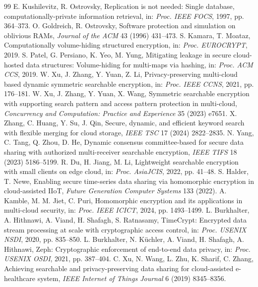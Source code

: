 \documentclass[11pt,a4paper]{article}
\begin{document}
\begin{thebibliography}{99}
 E. Kushilevitz, R. Ostrovsky, Replication is not needed: Single database, computationally-private information retrieval, in: \textit{Proc. IEEE FOCS}, 1997, pp. 364--373.
 O. Goldreich, R. Ostrovsky, Software protection and simulation on oblivious RAMs, \textit{Journal of the ACM} 43 (1996) 431--473.
 S. Kamara, T. Moataz, Computationally volume-hiding structured encryption, in: \textit{Proc. EUROCRYPT}, 2019.
 S. Patel, G. Persiano, K. Yeo, M. Yung, Mitigating leakage in secure cloud-hosted data structures: Volume-hiding for multi-maps via hashing, in: \textit{Proc. ACM CCS}, 2019.
 W. Xu, J. Zhang, Y. Yuan, Z. Li, Privacy-preserving multi-cloud based dynamic symmetric searchable encryption, in: \textit{Proc. IEEE CCNS}, 2021, pp. 176--181.
 W. Xu, J. Zhang, Y. Yuan, X. Wang, Symmetric searchable encryption with supporting search pattern and access pattern protection in multi-cloud, \textit{Concurrency and Computation: Practice and Experience} 35 (2023) e7651.
 X. Zhang, C. Huang, Y. Su, J. Qin, Secure, dynamic, and efficient keyword search with flexible merging for cloud storage, \textit{IEEE TSC} 17 (2024) 2822--2835.
 N. Yang, C. Tang, Q. Zhou, D. He, Dynamic consensus committee-based for secure data sharing with authorized multi-receiver searchable encryption, \textit{IEEE TIFS} 18 (2023) 5186--5199.
 R. Du, H. Jiang, M. Li, Lightweight searchable encryption with small clients on edge cloud, in: \textit{Proc. AsiaJCIS}, 2022, pp. 41--48.
 S. Halder, T. Newe, Enabling secure time-series data sharing via homomorphic encryption in cloud-assisted IIoT, \textit{Future Generation Computer Systems} 133 (2022).
 A. Kamble, M. M. Jiet, C. Puri, Homomorphic encryption and its applications in multi-cloud security, in: \textit{Proc. IEEE ICICT}, 2024, pp. 1493--1499.
 L. Burkhalter, A. Hithnawi, A. Viand, H. Shafagh, S. Ratnasamy, TimeCrypt: Encrypted data stream processing at scale with cryptographic access control, in: \textit{Proc. USENIX NSDI}, 2020, pp. 835--850.
 L. Burkhalter, N. K\"uchler, A. Viand, H. Shafagh, A. Hithnawi, Zeph: Cryptographic enforcement of end-to-end data privacy, in: \textit{Proc. USENIX OSDI}, 2021, pp. 387--404.
 C. Xu, N. Wang, L. Zhu, K. Sharif, C. Zhang, Achieving searchable and privacy-preserving data sharing for cloud-assisted e-healthcare system, \textit{IEEE Internet of Things Journal} 6 (2019) 8345--8356.

\end{thebibliography}
\end{document}

